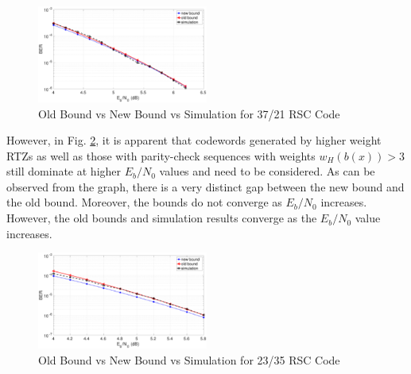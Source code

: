 \begin{figure}[h!]
\centering
		\includegraphics[width=0.5\textwidth]{./Images/RSC_37_21_lower_weights.eps}
		\caption{Old Bound vs New Bound vs Simulation for 37/21 RSC Code}
		\label{simFig2}
		\end{figure}
However, in Fig. \ref{simFig3}, it is apparent that codewords generated by higher weight RTZs as well as those with parity-check sequences with weights $w_H(b(x))>3$ still dominate at higher $E_b/N_0$ values and need to be considered. As can be observed from the graph, there is a very distinct gap between the new bound and the old bound. Moreover, the bounds do not converge as $E_b/N_0$ increases. However, the old bounds and simulation results converge as the $E_b/N_0$ value increases. 

\begin{figure}[h!]
\centering
		\includegraphics[width=0.5\textwidth]{./Images/RSC_23_35_lower_weights.eps}
		\caption{Old Bound vs New Bound vs Simulation for 23/35 RSC Code}
		\label{simFig3}
		\end{figure}
		

